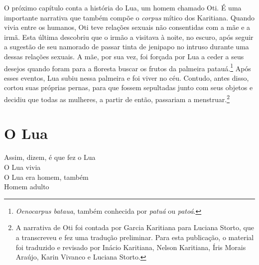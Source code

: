 
\thispagestyle{empty}
\mbox{}
\vfill
\noindent{}O próximo capítulo conta a história do Lua, um homem chamado Oti. É uma importante narrativa que também compõe o \emph{corpus} mítico dos Karitiana. Quando vivia entre os humanos, Oti teve relações sexuais não consentidas com a mãe e a irmã. Esta última descobriu que o irmão a visitava à noite, no escuro, após seguir a sugestão de seu namorado de passar tinta de jenipapo no intruso durante uma dessas relações sexuais. A mãe, por sua vez, foi forçada por Lua a ceder a seus desejos quando foram para a floresta buscar os frutos da palmeira patauá.\footnote{\emph{Oenocarpus bataua}, também conhecida por \emph{patuá} ou \emph{patoá}.} Após esses eventos, Lua subiu nessa palmeira e foi viver no céu. Contudo, antes disso, cortou suas próprias pernas, para que fossem sepultadas junto com seus objetos e decidiu que todas as mulheres, a partir de então, passariam a menstruar.\footnote{A narrativa de Oti foi contada por Garcia Karitiana para Luciana Storto, que a transcreveu e fez uma tradução preliminar. Para esta publicação, o material foi traduzido e revisado por Inácio Karitiana, Nelson Karitiana, Íris Morais Araújo, Karin Vivanco e Luciana Storto.}
\pagebreak


\chapter*{O Lua}

\begin{linenumbers}\begingroup\raggedright
\noindent Assim, dizem, é que fez o Lua\\
O Lua vivia\\
O Lua era homem, também\\
Homem adulto
\end{linenumbers}\endgroup

\bigskip


